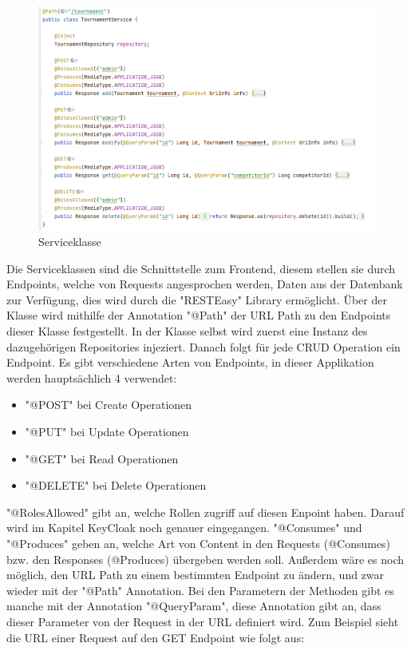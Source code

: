 \begin{figure}[H]
    \includegraphics[scale=0.6]{pics/backend/service_class.png}
    \caption{Serviceklasse}
\end{figure}

Die Serviceklassen sind die Schnittstelle zum Frontend, diesem stellen sie durch Endpoints, welche von Requests angesprochen werden, Daten aus der Datenbank zur Verfügung, dies wird durch die "RESTEasy" Library ermöglicht.
Über der Klasse wird mithilfe der Annotation "@Path" der URL Path zu den Endpoints dieser Klasse festgestellt. In der Klasse selbst wird zuerst eine Instanz des dazugehörigen Repositories injeziert. 
Danach folgt für jede CRUD Operation ein Endpoint. Es gibt verschiedene Arten von Endpoints, in dieser Applikation werden hauptsächlich 4 verwendet:

\begin{itemize}
    \item "@POST" bei Create Operationen
    \item "@PUT" bei Update Operationen
    \item "@GET" bei Read Operationen
    \item "@DELETE" bei Delete Operationen
\end{itemize}

"@RolesAllowed" gibt an, welche Rollen zugriff auf diesen Enpoint haben. Darauf wird im Kapitel KeyCloak noch genauer eingegangen. "@Consumes" und "@Produces" geben an, 
welche Art von Content in den Requests (@Consumes) bzw. den Responses (@Produces) übergeben werden soll. Außerdem wäre es noch möglich, den URL Path zu einem bestimmten Endpoint zu ändern, 
und zwar wieder mit der "@Path" Annotation. Bei den Parametern der Methoden gibt es manche mit der Annotation "@QueryParam", diese Annotation gibt an, dass dieser Parameter von der 
Request in der URL definiert wird. Zum Beispiel sieht die URL einer Request auf den GET Endpoint wie folgt aus:


